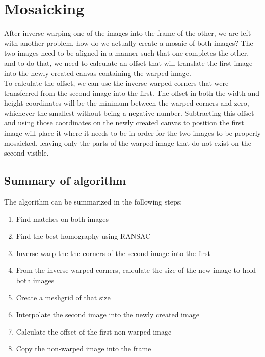 \documentclass[10pt,twocolumn,letterpaper]{article}
\begin{document}
\section{Mosaicking}
After inverse warping one of the images into the frame of the other, we are left with another problem, how do we actually create a mosaic of both images?
The two images need to be aligned in a manner such that one completes the other, and to do that, we need to calculate an offset that will translate the first image into the newly created canvas containing the warped image.\\
To calculate the offset, we can use the inverse warped corners that were transferred from the second image into the first. The offset in both the width and height coordinates will be the minimum between the warped corners and zero, whichever the smallest without being a negative number. Subtracting this offset and using those coordinates on the newly created canvas to position the first image will place it where it needs to be in order for the two images to be properly mosaicked, leaving only the parts of the warped image that do not exist on the second visible.\\
\subsection{Summary of algorithm}
The algorithm can be summarized in the following steps:
\begin{enumerate}
\item Find matches on both images
\item Find the best homography using RANSAC
\item Inverse warp the the corners of the second image into the first
\item From the inverse warped corners, calculate the size of the new image to hold both images
\item Create a meshgrid of that size
\item Interpolate the second image into the newly created image
\item Calculate the offset of the first non-warped image
\item Copy the non-warped image into the frame
\end{enumerate}
\end{document}

